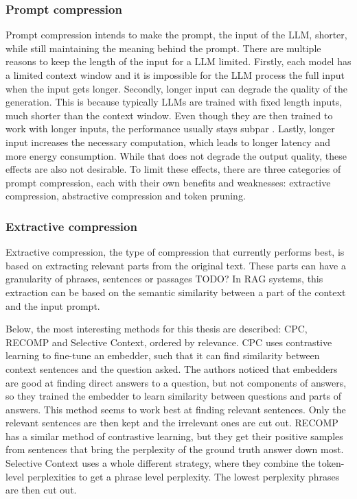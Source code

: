 \subsubsection{Prompt compression}
Prompt compression intends to make the prompt, the input of the LLM, shorter, while still maintaining the meaning behind the prompt. There are multiple reasons to keep the length of the input for a LLM limited. Firstly, each model has a limited context window and it is impossible for the LLM process the full input when the input gets longer. Secondly, longer input can degrade the quality of the generation. This is because typically LLMs are trained with fixed length inputs, much shorter than the context window. Even though they are then trained to work with longer inputs, the performance usually stays subpar \cite{liu2024lost}. Lastly, longer input increases the necessary computation, which leads to longer latency and more energy consumption. While that does not degrade the output quality, these effects are also not desirable. To limit these effects, there are three categories of prompt compression, each with their own benefits and weaknesses: extractive compression, abstractive compression and token pruning.

\subsubsection{Extractive compression}
Extractive compression, the type of compression that currently performs best, is based on extracting relevant parts from the original text. These parts can have a granularity of phrases, sentences or passages TODO? In RAG systems, this extraction can be based on the semantic similarity between a part of the context and the input prompt. 

Below, the most interesting methods for this thesis are described: CPC, RECOMP and Selective Context, ordered by relevance. CPC uses contrastive learning to fine-tune an embedder, such that it can find similarity between context sentences and the question asked. The authors noticed that embedders are good at finding direct answers to a question, but not components of answers, so they trained the embedder to learn similarity between questions and parts of answers. This method seems to work best at finding relevant sentences. Only the relevant sentences are then kept and the irrelevant ones are cut out. RECOMP has a similar method of contrastive learning, but they get their positive samples from sentences that bring the perplexity of the ground truth answer down most. Selective Context uses a whole different strategy, where they combine the token-level perplexities to get a phrase level perplexity. The lowest perplexity phrases are then cut out.
